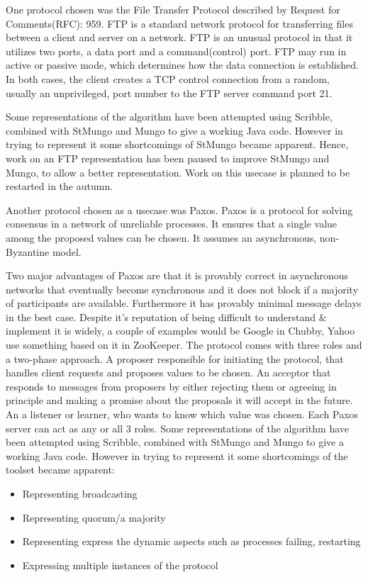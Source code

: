One protocol chosen was the File Transfer Protocol described by Request for Comments(RFC): 959\cite{FTP-rfc}. FTP is a standard network protocol for transferring  files between a client and server on a network.  FTP is an unusual protocol in that it utilizes two ports, a data port and a command(control) port. FTP may run in active or passive mode, which determines how the data connection is established. In both cases, the client creates a TCP control connection from a random, usually an unprivileged, port number to the FTP server command port 21.

Some representations of the algorithm have been attempted using Scribble, combined with StMungo and Mungo to give a working Java code. However in trying to represent it some shortcomings of StMungo became apparent. Hence, work on an FTP representation has been paused to improve StMungo and Mungo, to allow a better representation. Work on this usecase is planned to be restarted in the autumn.


Another protocol chosen as a usecase was Paxos. Paxos is a protocol for solving consensus in a network of unreliable processes. It ensures that a single value among the proposed values can be chosen. It assumes an asynchronous, non-Byzantine model.\cite{lamport1998part}

Two major advantages of Paxos are that it is provably correct in asynchronous networks that eventually become synchronous and it does not block if a majority of participants are available. Furthermore it has provably minimal message delays in the best case. Despite it's reputation of being difficult to understand \& implement it is widely, a couple of examples would be Google in Chubby\cite{chandra2007paxos}, Yahoo use something based on it in ZooKeeper.
The protocol comes with three roles and a two-phase approach. A proposer
responsible for initiating the protocol, that handles client requests and
proposes values to be chosen. An acceptor that responds to messages from proposers by either rejecting them or agreeing in principle and making a promise about the proposals it will accept in the future. An a listener or learner, who wants to know which value was chosen. Each Paxos server can act as any or all 3 roles.\cite{lamport2001paxos} Some representations of the algorithm have been attempted using Scribble, combined with StMungo and Mungo to give a working Java code. However in trying to represent it some shortcomings of the toolset became apparent:
\begin{itemize}
\item Representing broadcasting
\item Representing quorum/a majority
\item Representing express the dynamic aspects such as processes failing, restarting
\item Expressing multiple instances of the protocol
\end{itemize}


